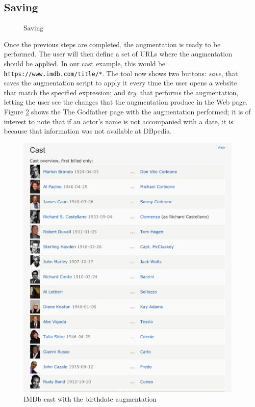 \documentclass[runningheads]{llncs}
\begin{document}
\subsection{Saving}

\begin{figure}
  \centering
    \caption{Saving}
    \label{fig-saving}
\end{figure}


Once the previous steps are completed, the augmentation is ready to be performed. The user will then define a set of URLs where the augmentation should be applied. In our cast example, this would be \texttt{https://www.imdb.com/title/*}. The tool now shows two buttons: \textit{save}, that saves the augmentation script to apply it every time the user opens a website that match the specified expression; and \textit{try}, that performs the augmentation, letting the user see the changes that the augmentation produce in the Web page. Figure \ref{fig-finalAugmentation} shows the The Godfather page with the augmentation performed; it is of interest to note that if an actor's name is not accompanied with a date, it is because that information was not available at DBpedia.

\begin{figure}
  \centering
    \includegraphics[width=0.85\linewidth]{tool/swa-despues.png}
    \caption{IMDb cast with the birthdate augmentation}
    \label{fig-finalAugmentation}
\end{figure}
\end{document}
